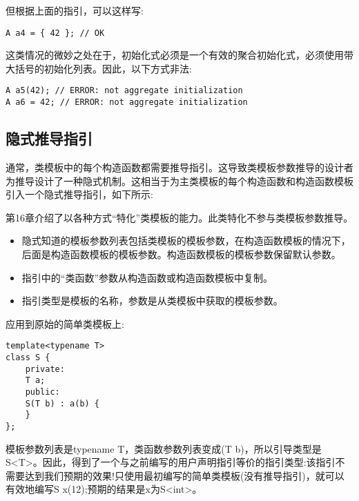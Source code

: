 但根据上面的指引，可以这样写:

\begin{lstlisting}[style=styleCXX]
A a4 = { 42 }; // OK
\end{lstlisting}

这类情况的微妙之处在于，初始化式必须是一个有效的聚合初始化式，必须使用带大括号的初始化列表。因此，以下方式非法:

\begin{lstlisting}[style=styleCXX]
A a5(42); // ERROR: not aggregate initialization
A a6 = 42; // ERROR: not aggregate initialization
\end{lstlisting}

\subsection{隐式推导指引}

通常，类模板中的每个构造函数都需要推导指引。这导致类模板参数推导的设计者为推导设计了一种隐式机制。这相当于为主类模板的每个构造函数和构造函数模板引入一个隐式推导指引，如下所示:

\begin{tcolorbox}[colback=webgreen!5!white,colframe=webgreen!75!black]
\hspace*{0.75cm}第16章介绍了以各种方式“特化”类模板的能力。此类特化不参与类模板参数推导。
\end{tcolorbox}

\begin{itemize}
\item 
隐式知道的模板参数列表包括类模板的模板参数，在构造函数模板的情况下，后面是构造函数模板的模板参数。构造函数模板的模板参数保留默认参数。

\item 
指引中的“类函数”参数从构造函数或构造函数模板中复制。

\item 
指引类型是模板的名称，参数是从类模板中获取的模板参数。
\end{itemize}	

应用到原始的简单类模板上:

\begin{lstlisting}[style=styleCXX]
template<typename T>
class S {
	private:
	T a;
	public:
	S(T b) : a(b) {
	}
};
\end{lstlisting}

模板参数列表是typename T，类函数参数列表变成(T b)，所以引导类型是S<T>。因此，得到了一个与之前编写的用户声明指引等价的指引类型:该指引不需要达到我们预期的效果!只使用最初编写的简单类模板(没有推导指引)，就可以有效地编写S x(12);预期的结果是x为S<int>。

